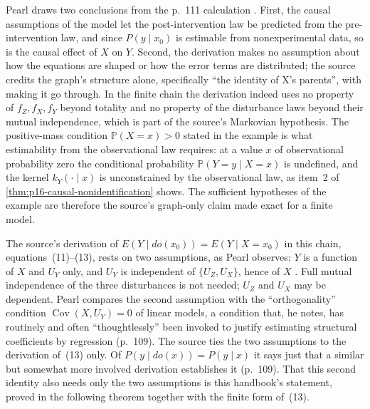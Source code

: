 Pearl draws two conclusions from the p.~111 calculation
\cite[sec.~3.2.3, p.~111]{Pearl2009CausalOverview}. First, the causal
assumptions of the model let the post-intervention law be predicted from
the pre-intervention law, and since \(P(y\mid x_0)\) is estimable from
nonexperimental data, so is the causal effect of \(X\) on \(Y\). Second,
the derivation makes no assumption about how the equations are shaped
or how the error terms are distributed; the source credits the graph's
structure alone, specifically ``the identity of X's parents'', with
making it go through. In the finite chain the derivation indeed uses no property of
\(f_Z,f_X,f_Y\) beyond totality and no property of the disturbance laws
beyond their mutual independence, which is part of the source's
Markovian hypothesis. The positive-mass condition
\(\mathbb P(X=x)>0\) stated in the example is what estimability from the
observational law requires: at a value \(x\) of observational probability
zero the conditional probability \(\mathbb P(Y=y\mid X=x)\) is undefined,
and the kernel \(k_Y(\cdot\mid x)\) is unconstrained by the observational
law, as item~2 of \cref{thm:p16-causal-nonidentification} shows. The
sufficient hypotheses of the example are therefore the source's
graph-only claim made exact for a finite model.

The source's derivation of \(E(Y\mid do(x_0))=E(Y\mid X=x_0)\) in this
chain, equations~(11)--(13), rests on two assumptions, as Pearl observes:
\(Y\) is a function of \(X\) and \(U_Y\) only, and \(U_Y\) is independent
of \(\{U_Z,U_X\}\), hence of \(X\)
\cite[sec.~3.2.2, p.~109]{Pearl2009CausalOverview}. Full mutual
independence of the three disturbances is not needed; \(U_Z\) and \(U_X\)
may be dependent. Pearl compares the second assumption with the
``orthogonality'' condition \(\operatorname{Cov}(X,U_Y)=0\) of linear
models, a condition that, he notes, has routinely and often
``thoughtlessly'' been invoked to justify estimating structural
coefficients by regression (p.~109). The source ties the two assumptions to
the derivation of~(13) only. Of \(P(y\mid do(x))=P(y\mid x)\) it says
just that a similar but somewhat more involved derivation establishes it
(p.~109). That this second identity also needs only the two assumptions is
this handbook's statement, proved in the following theorem together with
the finite form of~(13).


